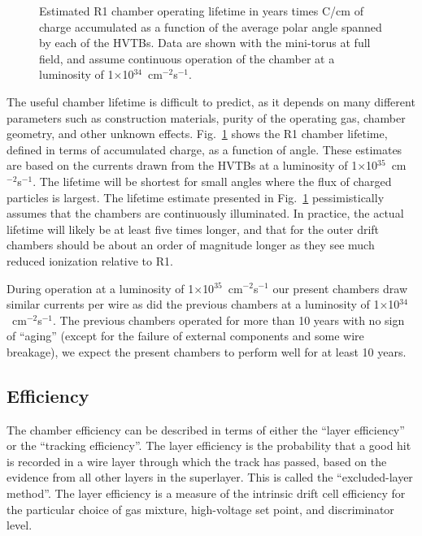 \begin{figure}[htpb]
\vspace{5.0 cm} 
\caption{\small{Estimated R1 chamber operating lifetime in years times C/cm of
charge accumulated as a function of the average polar angle spanned by
each of the HVTBs.  Data are shown with the mini-torus at full field, and
assume continuous operation of the chamber at a luminosity of
1$\times$10$^{34}$~cm$^{-2}$s$^{-1}$.}}
\label{life}
\end{figure}

The useful chamber lifetime is difficult to predict, as it depends on many 
different parameters such as construction materials, purity of the operating gas, 
chamber geometry, and other unknown effects.  Fig.~\ref{life} shows the R1 chamber
lifetime, defined in terms of accumulated charge, as a function of angle.  These 
estimates are based on the currents drawn from the HVTBs at a luminosity of 
1$\times$10$^{35}$~cm$^{-2}$s$^{-1}$.  The lifetime will be shortest for small 
angles where the flux of charged particles is largest.  The lifetime estimate 
presented in Fig.~\ref{life} pessimistically assumes that the chambers are 
continuously illuminated.  In practice, the actual lifetime will likely be at least 
five times longer, and that for the outer drift chambers should be about an order of 
magnitude longer as they see much reduced ionization relative to R1.

During operation at a luminosity of 1$\times$10$^{35}$~cm$^{-2}$s$^{-1}$ our present
chambers draw similar currents per wire as did the previous chambers at a luminosity of 
1$\times$10$^{34}$~cm$^{-2}$s$^{-1}$.
The previous chambers operated for more than 10 years with no 
sign of ``aging'' (except for 
the failure of external components and some wire breakage), we expect the present
chambers to perform well for at least 10 years.


\subsection{Efficiency}

\hskip 0.15in
The chamber efficiency can be described in terms of either the ``layer efficiency'' 
or the ``tracking efficiency''.  The layer efficiency is the probability that a
good hit is recorded in a wire layer through which the track has passed, based on 
the evidence from all other layers in the superlayer.  This is called the 
``excluded-layer method''.  The layer efficiency is a measure of the intrinsic drift 
cell efficiency for the particular choice of gas mixture, high-voltage set point, and 
discriminator level.  

